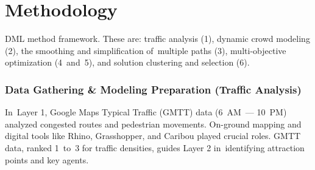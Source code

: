 \section*{%
  Methodology
 }

DML method framework. These are: traffic analysis (1), dynamic crowd modeling (2), the smoothing and simplification of multiple paths (3), multi-objective optimization (4~and~5), and solution clustering and selection (6).
\vfill
\subsubsection*{Data Gathering \& Modeling Preparation (Traffic Analysis)}
\begin{center}
	\begin{minipage}{0.85\linewidth}
		
		
		
	\end{minipage}
\end{center}
In Layer 1, Google Maps Typical Traffic (GMTT) data (6~AM — 10~PM) analyzed congested routes and pedestrian movements. On-ground mapping and digital tools like Rhino, Grasshopper, and Caribou played crucial roles. GMTT data, ranked 1~to~3 for traffic densities, guides Layer 2 in identifying attraction points and key agents.
\columnbreak%
